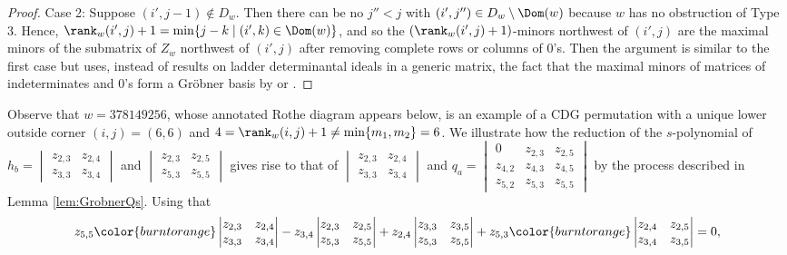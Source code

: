 \begin{proof}
Case 2: Suppose $(i',j-1) \notin D_w$.  Then there can be no $j''<j$ with $(i',j'') \in D_w\setminus \Dom(w)$ because $w$ has no obstruction of Type $3$.  Hence, $\rank_w(i',j)+1 = \min\{j-k \mid (i',k) \in \Dom(w)\}$, and so the $(\rank_w(i',j)+1)$-minors northwest of $(i',j)$ are the maximal minors of the submatrix of $Z_w$ northwest of $(i',j)$ after removing complete rows or columns of $0$'s.  Then the argument is similar to the first case but uses, instead of results on ladder determinantal ideals in a generic matrix, the fact that the maximal minors of matrices of indeterminates and $0$'s form a Gr\"obner basis by \cite[Theorem 4.2]{CDG15} or \cite[Proposition 5.4]{Boo11}.  
\end{proof}

\begin{example}\label{ex:Spoly}
Observe that $w = 378149256$, whose annotated Rothe diagram appears below, is an example of a CDG permutation with a unique lower outside corner  $(i,j) = (6,6)$ and $4=\rank_w(i,j)+1 \neq \min\{m_1,m_2\}=6$.  We illustrate how the reduction of the $s$-polynomial of $h_b = \begin{vmatrix} z_{2,3} & z_{2,4} \\ z_{3,3} & z_{3,4} \end{vmatrix}$ and $\begin{vmatrix} z_{2,3} & z_{2,5} \\ z_{5,3} & z_{5,5} \end{vmatrix}$ gives rise to that of $\begin{vmatrix} z_{2,3} & z_{2,4} \\ z_{3,3} & z_{3,4} \end{vmatrix}$ and $q_a = \begin{vmatrix} 0 & z_{2,3} & z_{2,5} \\ z_{4,2} & z_{4,3} & z_{4,5} \\ z_{5,2} & z_{5,3} & z_{5,5} \end{vmatrix}$ by the process described in Lemma \ref{lem:GrobnerQs}.  Using that \[
z_{5,5} { \color{burntorange}\begin{vmatrix} z_{2,3} & z_{2,4} \\ z_{3,3} & z_{3,4} \end{vmatrix}}-z_{3,4} \begin{vmatrix} z_{2,3} & z_{2,5} \\ z_{5,3} & z_{5,5} \end{vmatrix} +z_{2,4} \begin{vmatrix} z_{3,3} & z_{3,5} \\ z_{5,3} & z_{5,5} \end{vmatrix} + z_{5,3} {\color{burntorange} \begin{vmatrix} z_{2,4} & z_{2,5} \\ z_{3,4} & z_{3,5} \end{vmatrix}} = 0,
\]
\end{example}
